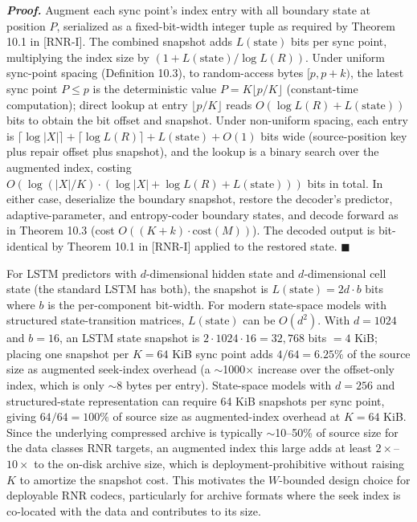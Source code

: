 \documentclass[
]{article}
\begin{document}
\emph{\textbf{Proof.}} Augment each sync point's index entry with
all boundary state at position $P$, serialized as a fixed-bit-width
integer tuple as required by Theorem 10.1 in [RNR-I]. The combined snapshot adds
$L(\text{state})$ bits per sync point, multiplying the index size by
$(1 + L(\text{state}) / \log L(R))$. Under uniform sync-point
spacing (Definition 10.3), to random-access bytes $[p, p+k)$, the
latest sync point $P \leq p$ is the deterministic value
$P = K \lfloor p/K \rfloor$ (constant-time computation); direct
lookup at entry $\lfloor p/K \rfloor$ reads
$O(\log L(R) + L(\text{state}))$ bits to obtain the bit offset and
snapshot. Under non-uniform spacing, each entry is
$\lceil \log |X| \rceil + \lceil \log L(R) \rceil + L(\text{state})
+ O(1)$ bits wide (source-position key plus repair offset plus
snapshot), and the lookup is a binary search over the augmented
index, costing
$O(\log(|X|/K) \cdot (\log |X| + \log L(R) + L(\text{state})))$
bits in total.
In either case, deserialize the boundary snapshot, restore the
decoder's predictor, adaptive-parameter, and entropy-coder boundary
states, and decode forward as in Theorem 10.3 (cost
$O((K+k) \cdot \mathrm{cost}(M))$).
The decoded output is bit-identical by Theorem 10.1 in [RNR-I] applied to the
restored state. \hfill$\blacksquare$

For LSTM predictors with $d$-dimensional hidden state and
$d$-dimensional cell state (the standard LSTM has both), the
snapshot is $L(\text{state}) = 2 d \cdot b$ bits where $b$ is the
per-component bit-width. For modern state-space models with
structured state-transition matrices, $L(\text{state})$ can be
$O(d^2)$. With $d = 1024$ and $b = 16$, an LSTM state snapshot is
$2 \cdot 1024 \cdot 16 = 32{,}768$ bits $= 4$ KiB; placing one
snapshot per $K = 64$ KiB sync point adds $4 / 64 = 6.25\%$ of the
source size as augmented seek-index overhead (a $\sim$1000$\times$
increase over the offset-only index, which is only $\sim$8 bytes
per entry). State-space models with $d = 256$ and structured-state
representation can require 64 KiB snapshots per sync point, giving
$64 / 64 = 100\%$ of source size as augmented-index overhead at
$K = 64$ KiB. Since the underlying compressed archive is typically
$\sim$10--50\% of source size for the data classes RNR targets, an
augmented index this large adds at least $2 \times$--$10 \times$
to the on-disk archive size, which is deployment-prohibitive
without raising $K$ to amortize the snapshot cost. This motivates the $W$-bounded
design choice for deployable RNR codecs, particularly for archive
formats where the seek index is co-located with the data and
contributes to its size.
\end{document}

